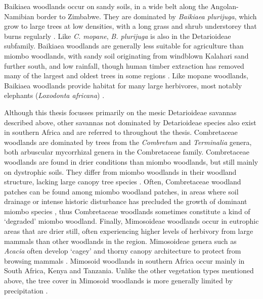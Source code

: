 \begin{refsection}
Baikiaea woodlands occur on sandy soils, in a wide belt along the Angolan-Namibian border to Zimbabwe. They are dominated by \textit{Baikiaea plurijuga}, which grow to large trees at low densities, with a long grass and shrub understorey that burns regularly \citep{Werger1978}. Like \textit{C. mopane}, \textit{B. plurijuga} is also in the Detarioideae subfamily. Baikiaea woodlands are generally less suitable for agriculture than miombo woodlands, with sandy soil originating from windblown Kalahari sand further south, and low rainfall, though human timber extraction has removed many of the largest and oldest trees in some regions \citep{Gambiza2005}. Like mopane woodlands, Baikiaea woodlands provide habitat for many large herbivores, most notably elephants (\textit{Loxodonta africana}) \citep{Holdo2007}.

Although this thesis focusses primarily on the mesic Detarioideae savannas described above, other savannas not dominated by Detarioideae species also exist in southern Africa and are referred to throughout the thesis. Combretaceae woodlands are dominated by trees from the \textit{Combretum} and \textit{Terminalia} genera, both arbuscular mycorrhizal genera in the Combretaceae family. Combretaceae woodlands are found in drier conditions than miombo woodlands, but still mainly on dystrophic soils. They differ from miombo woodlands in their woodland structure, lacking large canopy tree species \citep{Frost1996}. Often, Combretaceae woodland patches can be found among miombo woodland patches, in areas where soil drainage or intense historic disturbance has precluded the growth of dominant miombo species \citep{Goncalves2017}, thus Combretaceae woodlands sometimes constitute a kind of `degraded' miombo woodland. Finally, Mimosoideae woodlands occur in eutrophic areas that are drier still, often experiencing higher levels of herbivory from large mammals than other woodlands in the region. Mimosoideae genera such as \textit{Acacia} often develop `cagey' and thorny canopy architecture to protect from browsing mammals \citep{Moncrieff2014}. Mimosoid woodlands in southern Africa occur mainly in South Africa, Kenya and Tanzania. Unlike the other vegetation types mentioned above, the tree cover in Mimosoid woodlands is more generally limited by precipitation \citep{White1983}.


\end{refsection}
